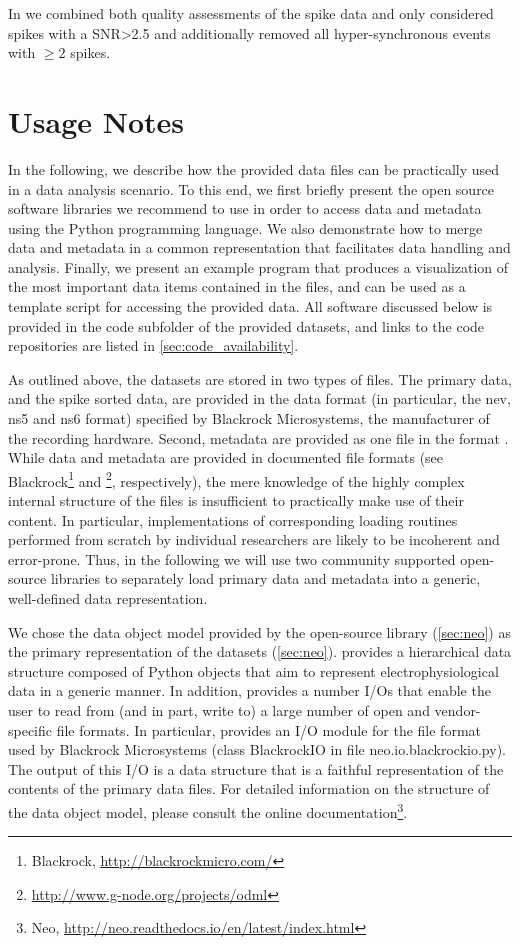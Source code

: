 In \citet{Torre_2016} we combined both quality assessments of the spike data and only considered spikes with a SNR>2.5 and additionally removed all hyper-synchronous events with $\ge2$ spikes. 


\section{Usage Notes}
\label{sec:usage}

In the following, we describe how the provided data files can be practically used in a data analysis scenario. To this end, we first briefly present the open source software libraries we recommend to use in order to access data and metadata using the Python programming language. We also demonstrate how to merge data and metadata in a common representation that facilitates data handling and analysis. Finally, we present an example program that produces a visualization of the most important data items contained in the files, and can be used as a template script for accessing the provided data. All software discussed below is provided in the code subfolder of the provided datasets, and links to the code repositories are listed in \cref{sec:code_availability}.

As outlined above, the datasets are stored in two types of files. The primary data, and the spike sorted data, are provided in the data format (in particular, the nev, ns5 and ns6 format) specified by Blackrock Microsystems, the manufacturer of the recording hardware. Second, metadata are provided as one file in the  format \citep{Grewe_2011}. While data and metadata are provided in documented file formats (see Blackrock\footnote{Blackrock, \url{http://blackrockmicro.com/}} and \footnote{\url{http://www.g-node.org/projects/odml}}, respectively), the mere knowledge of the highly complex internal structure of the files is insufficient to practically make use of their content. In particular, implementations of corresponding loading routines performed from scratch by individual researchers are likely to be incoherent and error-prone. Thus, in the following we will use two community supported open-source libraries to separately load primary data and metadata into a generic, well-defined data representation. 

We chose the data object model provided by the open-source  library (\cref{sec:neo}) \citep{Garcia_2014} as the primary representation of the datasets (\cref{sec:neo}).  provides a hierarchical data structure composed of Python objects that aim to represent electrophysiological data in a generic manner. In addition,  provides a number I/Os that enable the user to read from (and in part, write to) a large number of open and vendor-specific file formats. In particular,  provides an I/O module for the file format used by Blackrock Microsystems (class BlackrockIO in file neo.io.blackrockio.py). The output of this I/O is a  data structure that is a faithful representation of the contents of the primary data files. For detailed information on the structure of the  data object model, please consult the online documentation\footnote{Neo, \url{http://neo.readthedocs.io/en/latest/index.html}}.

